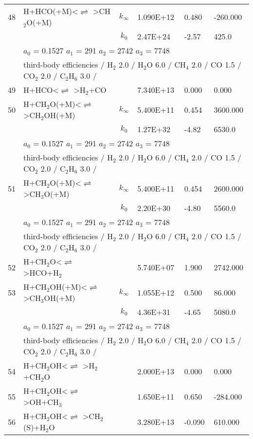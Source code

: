 \documentclass[11pt]{article}
\begin{document}
\begin{table}[hbt]
\begin{tabular}{|r l c l l l|}
48 &	H+HCO(+M)<$\rightleftharpoons$ >CH$_{2}$O(+M)&	$k_{\infty}$&	1.090E+12&	0.480&	-260.000\\ 
	&	&	$k_0$&	2.47E+24&-2.57&	  425.0\\ 
	&\multicolumn{5}{l|}{	$a_0$ = 0.1527	$a_1$ = 291	$a_2$ = 2742	$a_3$ = 7748}\\ 
	&\multicolumn{5}{l|}{third-body efficiencies  / H$_{2}$ 2.0 / H$_{2}$O 6.0 / CH$_{4}$ 2.0 / CO 1.5 / CO$_{2}$ 2.0 / C$_{2}$H$_{6}$ 3.0 /}\\ 
49 &	H+HCO<$\rightleftharpoons$ >H$_{2}$+CO&	&	7.340E+13&	0.000&	0.000\\ 
50 &	H+CH$_{2}$O(+M)<$\rightleftharpoons$ >CH$_{2}$OH(+M)&	$k_{\infty}$&	5.400E+11&	0.454&	3600.000\\ 
	&	&	$k_0$&	1.27E+32&-4.82&	 6530.0\\ 
	&\multicolumn{5}{l|}{	$a_0$ = 0.1527	$a_1$ = 291	$a_2$ = 2742	$a_3$ = 7748}\\ 
	&\multicolumn{5}{l|}{third-body efficiencies  / H$_{2}$ 2.0 / H$_{2}$O 6.0 / CH$_{4}$ 2.0 / CO 1.5 / CO$_{2}$ 2.0 / C$_{2}$H$_{6}$ 3.0 /}\\ 
51 &	H+CH$_{2}$O(+M)<$\rightleftharpoons$ >CH$_{3}$O(+M)&	$k_{\infty}$&	5.400E+11&	0.454&	2600.000\\ 
	&	&	$k_0$&	2.20E+30&-4.80&	 5560.0\\ 
	&\multicolumn{5}{l|}{	$a_0$ = 0.1527	$a_1$ = 291	$a_2$ = 2742	$a_3$ = 7748}\\ 
	&\multicolumn{5}{l|}{third-body efficiencies  / H$_{2}$ 2.0 / H$_{2}$O 6.0 / CH$_{4}$ 2.0 / CO 1.5 / CO$_{2}$ 2.0 / C$_{2}$H$_{6}$ 3.0 /}\\ 
52 &	H+CH$_{2}$O<$\rightleftharpoons$ >HCO+H$_{2}$&	&	5.740E+07&	1.900&	2742.000\\ 
53 &	H+CH$_{2}$OH(+M)<$\rightleftharpoons$ >CH$_{3}$OH(+M)&	$k_{\infty}$&	1.055E+12&	0.500&	86.000\\ 
	&	&	$k_0$&	4.36E+31&-4.65&	 5080.0\\ 
	&\multicolumn{5}{l|}{	$a_0$ = 0.1527	$a_1$ = 291	$a_2$ = 2742	$a_3$ = 7748}\\ 
	&\multicolumn{5}{l|}{third-body efficiencies  / H$_{2}$ 2.0 / H$_{2}$O 6.0 / CH$_{4}$ 2.0 / CO 1.5 / CO$_{2}$ 2.0 / C$_{2}$H$_{6}$ 3.0 /}\\ 
54 &	H+CH$_{2}$OH<$\rightleftharpoons$ >H$_{2}$+CH$_{2}$O&	&	2.000E+13&	0.000&	0.000\\ 
55 &	H+CH$_{2}$OH<$\rightleftharpoons$ >OH+CH$_{3}$&	&	1.650E+11&	0.650&	-284.000\\ 
56 &	H+CH$_{2}$OH<$\rightleftharpoons$ >CH$_{2}$(S)+H$_{2}$O&	&	3.280E+13&	-0.090&	610.000\\ 

\end{tabular}
\end{table}
\end{document}
